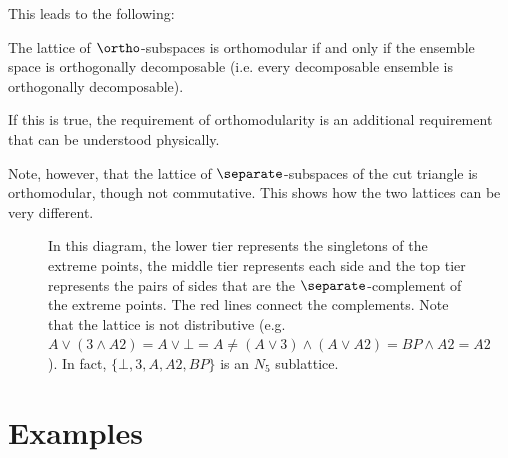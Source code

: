 This leads to the following:
\begin{conj}
	The lattice of $\ortho$-subspaces is orthomodular if and only if the ensemble space is orthogonally decomposable (i.e. every decomposable ensemble is orthogonally decomposable).
\end{conj}
If this is true, the requirement of orthomodularity is an additional requirement that can be understood physically.

Note, however, that the lattice of $\separate$-subspaces  of the cut triangle is orthomodular, though not commutative. This shows how the two lattices can be very different.

\begin{figure}[H]
	\centering
	\caption{In this diagram, the lower tier represents the singletons of the extreme points, the middle tier represents each side and the top tier represents the pairs of sides that are the $\separate$-complement of the extreme points. The red lines connect the complements. Note that the lattice is not distributive (e.g. $A\vee (3 \wedge A2) = A \vee \bot = A \neq (A\vee 3) \wedge (A \vee A2) = BP \wedge A2 = A2$). In fact, $\{\bot, 3, A, A2, BP\}$ is an $N_5$ sublattice. }
\end{figure}

\section{Examples}

